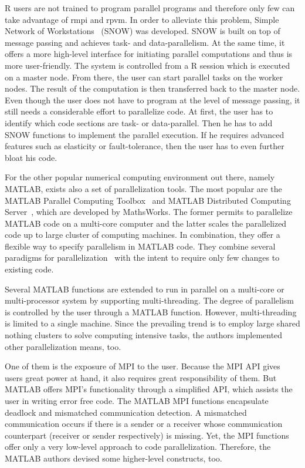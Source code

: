 R users are not trained to program parallel programs and therefore only few can take advantage of rmpi and rpvm.
In order to alleviate this problem, Simple Network of Workstations~\cite{tierney:pv0hros2008a} (SNOW) was developed.
SNOW is built on top of message passing and achieves task- and data-parallelism.
At the same time, it offers a more high-level interface for initiating parallel computations and thus is more user-friendly.
The system is controlled from a R session which is executed on a master node.
From there, the user can start parallel tasks on the worker nodes.
The result of the computation is then transferred back to the master node.
Even though the user does not have to program at the level of message passing, it still needs a considerable effort to parallelize code.
At first, the user has to identify which code sections are task- or data-parallel.
Then he has to add SNOW functions to implement the parallel execution.
If he requires advanced features such as elasticity or fault-tolerance, then the user has to even further bloat his code.

For the other popular numerical computing environment out there, namely MATLAB, exists also a set of parallelization tools.
The most popular are the MATLAB Parallel Computing Toolbox~\cite{parallelComputingToolbox} and MATLAB Distributed Computing Server~\cite{distributedComputingServer}, which are developed by MathsWorks.
The former permits to parallelize MATLAB code on a multi-core computer and the latter scales the parallelized code up to large cluster of computing machines.
In combination, they offer a flexible way to specify parallelism in MATLAB code.
They combine several paradigms for parallelization~\cite{sharma:ijpp2009a} with the intent to require only few changes to existing code.

Several MATLAB functions are extended to run in parallel on a multi-core or multi-processor system by supporting multi-threading.
The degree of parallelism is controlled by the user through a MATLAB function.
However, multi-threading is limited to a single machine.
Since the prevailing trend is to employ large shared nothing clusters to solve computing intensive tasks, the authors implemented other parallelization means, too.

One of them is the exposure of MPI to the user.
Because the MPI API gives users great power at hand, it also requires great responsibility of them.
But MATLAB offers MPI's functionality through a simplified API, which assists the user in writing error free code.
The MATLAB MPI functions encapsulate deadlock and mismatched communication detection.
A mismatched communication occurs if there is a sender or a receiver whose communication counterpart (receiver or sender respectively) is missing.
Yet, the MPI functions offer only a very low-level approach to code parallelization.
Therefore, the MATLAB authors devised some higher-level constructs, too.

